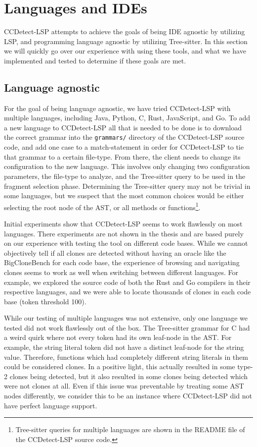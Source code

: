 \section{Languages and IDEs}

CCDetect-LSP attempts to achieve the goals of being IDE agnostic by utilizing LSP, and
programming language agnostic by utilizing Tree-sitter. In this section we will quickly go
over our experience with using these tools, and what we have implemented and tested to
determine if these goals are met.

\subsection*{Language agnostic}

For the goal of being language agnostic, we have tried CCDetect-LSP with multiple
languages, including Java, Python, C, Rust, JavaScript, and Go. To add a new language to
CCDetect-LSP all that is needed to be done is to download the correct grammar into the
\verb|grammars/| directory of the CCDetect-LSP source code, and add one case to a
match-statement in order for CCDetect-LSP to tie that grammar to a certain file-type. From
there, the client needs to change its configuration to the new language. This involves
only changing two configuration parameters, the file-type to analyze, and the Tree-sitter
query to be used in the fragment selection phase. Determining the Tree-sitter query may
not be trivial in some languages, but we suspect that the most common choices would be
either selecting the root node of the AST, or all methods or
functions\footnote{Tree-sitter queries for multiple languages are shown in the README file
of the CCDetect-LSP source code.}.

Initial experiments show that CCDetect-LSP seems to work flawlessly on most languages.
There experiments are not shown in the thesis and are based purely on our experience with
testing the tool on different code bases. While we cannot objectively tell if all clones
are detected without having an oracle like the BigCloneBench for each code base, the
experience of browsing and navigating clones seems to work as well when switching between
different languages. For example, we explored the source code of both the Rust and Go
compilers in their respective languages, and we were able to locate thousands of clones in
each code base (token threshold 100).

While our testing of multiple languages was not extensive, only one language we tested did
not work flawlessly out of the box. The Tree-sitter grammar for C had a weird quirk where
not every token had its own leaf-node in the AST. For example, the string literal token
did not have a distinct leaf-node for the string value. Therefore, functions which had
completely different string literals in them could be considered clones. In a positive
light, this actually resulted in some type-2 clones being detected, but it also resulted
in some clones being detected which were not clones at all. Even if this issue was
preventable by treating some AST nodes differently, we consider this to be an instance
where CCDetect-LSP did not have perfect language support.

